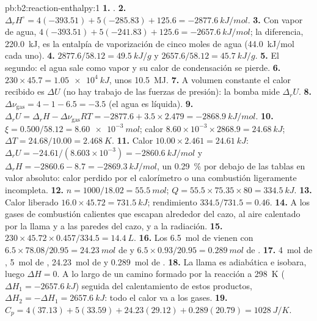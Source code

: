 \begin{solution}{pb:b2:reaction-enthalpy:1}
\textbf{1.} .
\textbf{2.} $\Delta_r H^\circ = 4(-393.51) + 5(-285.83) + 125.6 =
\qty{-2877.6}{kJ/mol}$.
\textbf{3.} Con vapor de agua, $4(-393.51) + 5(-241.83) + 125.6 =
\qty{-2657.6}{kJ/mol}$; la diferencia, \qty{220.0}{kJ}, es la entalpía de
vaporización de cinco moles de agua (\qty{44.0}{kJ/mol} cada uno).
\textbf{4.} $2877.6/58.12 = \qty{49.5}{kJ/g}$ y $2657.6/58.12 =
\qty{45.7}{kJ/g}$.
\textbf{5.} El segundo: el agua sale como vapor y su calor de
condensación se pierde.
\textbf{6.} $230 \times 45.7 = \qty{1.05e4}{kJ}$, unos \qty{10.5}{MJ}.
\textbf{7.} A volumen constante el calor recibido es $\Delta U$ (no hay
trabajo de las fuerzas de presión): la bomba mide $\Delta_r U$.
\textbf{8.} $\Delta\nu_{\text{gas}} = 4 - 1 - 6.5 = -3.5$ (el agua es
líquida).
\textbf{9.} $\Delta_r U = \Delta_r H - \Delta\nu_{\text{gas}}RT = -2877.6 +
3.5 \times 2.479 = \qty{-2868.9}{kJ/mol}$.
\textbf{10.} $\xi = 0.500/58.12 = \qty{8.60e-3}{mol}$; calor $8.60 \times
10^{-3} \times 2868.9 = \qty{24.68}{kJ}$; $\Delta T = 24.68/10.00 =
\qty{2.468}{K}$.
\textbf{11.} Calor $10.00 \times 2.461 = \qty{24.61}{kJ}$: $\Delta_r U =
-24.61/(8.603 \times 10^{-3}) = \qty{-2860.6}{kJ/mol}$ y $\Delta_r H =
-2860.6 - 8.7 = \qty{-2869.3}{kJ/mol}$, un \qty{0.29}{\percent} por debajo de las
tablas en valor absoluto: calor perdido por el calorímetro o una combustión
ligeramente incompleta.
\textbf{12.} $n = 1000/18.02 = \qty{55.5}{mol}$; $Q = 55.5 \times 75.35
\times 80 = \qty{334.5}{kJ}$.
\textbf{13.} Calor liberado $16.0 \times 45.72 = \qty{731.5}{kJ}$; rendimiento
$334.5/731.5 = 0.46$.
\textbf{14.} A los gases de combustión calientes que escapan alrededor del cazo, al
aire calentado por la llama y a las paredes del cazo, y a la radiación.
\textbf{15.} $230 \times 45.72 \times 0.457/334.5 = \qty{14.4}{L}$.
\textbf{16.} Los \qty{6.5}{mol} de  vienen con $6.5 \times 78.08/20.95 =
\qty{24.23}{mol}$ de  y $6.5 \times 0.93/20.95 = \qty{0.289}{mol}$
de .
\textbf{17.} \qty{4}{mol} de , \qty{5}{mol} de ,
\qty{24.23}{mol} de  y \qty{0.289}{mol} de .
\textbf{18.} La llama es adiabática e isobara, luego $\Delta H = 0$. A lo largo de un
camino formado por la reacción a \qty{298}{K} ($\Delta H_1 =
\qty{-2657.6}{kJ}$) seguida del calentamiento de estos productos, $\Delta H_2 =
-\Delta H_1 = \qty{+2657.6}{kJ}$: todo el calor va a los gases.
\textbf{19.} $C_p = 4(37.13) + 5(33.59) + 24.23(29.12) + 0.289(20.79) =
\qty{1028}{J/K}$.

\end{solution}
